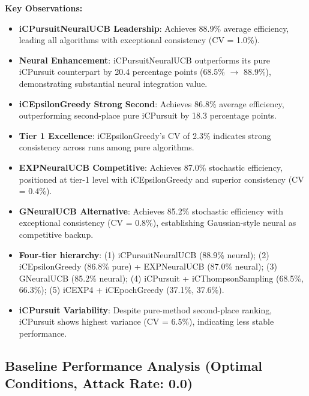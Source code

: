 \documentclass[12pt,a4paper]{article}
\newcommand{\primarytext}[1]{\textcolor{primaryblue}{\textbf{#1}}}
\newcommand{\secondarytext}[1]{\textcolor{secondaryblue}{\textbf{#1}}}
\newcommand{\warning}[1]{\textcolor{warningred}{\textbf{#1}}}
\newcommand{\legacy}[1]{\textcolor{legacycolor}{\textbf{#1}}}
\newcommand{\neural}[1]{\textcolor{neuralcolor}{\textbf{#1}}}
\begin{document}
\begin{tcolorbox}[colback=tableheader,colframe=primaryblue,title=\textbf{Primary iCMAB Performance Results (Stochastic Environment, Attack Rate: 0.25)}]
\textbf{Key Observations:}
\begin{itemize}
\item \neural{iCPursuitNeuralUCB Leadership}: Achieves 88.9\% average efficiency, leading all algorithms with exceptional consistency (CV = 1.0\%).
\item \neural{Neural Enhancement}: iCPursuitNeuralUCB outperforms its pure iCPursuit counterpart by 20.4 percentage points (68.5\% $\rightarrow$ 88.9\%), demonstrating substantial neural integration value.
\item \primarytext{iCEpsilonGreedy Strong Second}: Achieves 86.8\% average efficiency, outperforming second-place pure iCPursuit by 18.3 percentage points.
\item \primarytext{Tier 1 Excellence}: iCEpsilonGreedy's CV of 2.3\% indicates strong consistency across runs among pure algorithms.
\item \legacy{EXPNeuralUCB Competitive}: Achieves 87.0\% stochastic efficiency, positioned at tier-1 level with iCEpsilonGreedy and superior consistency (CV = 0.4\%).
\item \neural{GNeuralUCB Alternative}: Achieves 85.2\% stochastic efficiency with exceptional consistency (CV = 0.8\%), establishing Gaussian-style neural as competitive backup.
\item \secondarytext{Four-tier hierarchy}: (1) iCPursuitNeuralUCB (88.9\% neural); (2) iCEpsilonGreedy (86.8\% pure) + EXPNeuralUCB (87.0\% neural); (3) GNeuralUCB (85.2\% neural); (4) iCPursuit + iCThompsonSampling (68.5\%, 66.3\%); (5) iCEXP4 + iCEpochGreedy (37.1\%, 37.6\%).
\item \warning{iCPursuit Variability}: Despite pure-method second-place ranking, iCPursuit shows highest variance (CV = 6.5\%), indicating less stable performance.
\end{itemize}

\end{tcolorbox}

\subsection{Baseline Performance Analysis (Optimal Conditions, Attack Rate: 0.0)}
\end{document}

